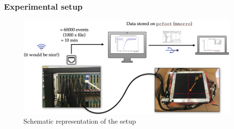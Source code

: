 \begin{frame} [fragile]
    \small
        \frametitle{Experimental setup}
                \begin{figure}
             \centering
                \includegraphics[scale=0.30]{figures/setup2.png}
                \caption{Schematic representation of the setup}
            \end{figure} 
    \end{frame}
